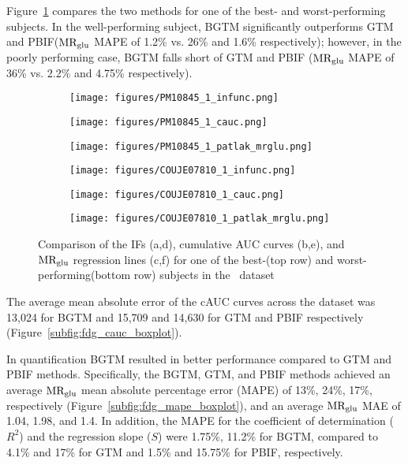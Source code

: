 Figure~\ref{fig:fdg_ifs} compares the two methods for one of the best- and worst-performing subjects.
In the well-performing subject, BGTM significantly outperforms GTM and PBIF($\text{MR}_{\text{glu}}$ MAPE of 1.2\% vs. 26\% and 1.6\% respectively); however, in the poorly performing case, BGTM falls short of GTM and PBIF ($\text{MR}_{\text{glu}}$ MAPE of 36\% vs. 2.2\% and 4.75\% respectively).

\begin{figure}[h]
	\centering
	\begin{subfigure}[b]{0.322\textwidth}
		\texttt{[image: figures/PM10845\_1\_infunc.png]}
		\caption{}
	\end{subfigure}
	\begin{subfigure}[b]{0.322\textwidth}
		\texttt{[image: figures/PM10845\_1\_cauc.png]}
		\caption{}
	\end{subfigure}
	\begin{subfigure}[b]{0.322\textwidth}
		\texttt{[image: figures/PM10845\_1\_patlak\_mrglu.png]}
		\caption{}
	\end{subfigure}
	\begin{subfigure}[b]{0.322\textwidth}
		\texttt{[image: figures/COUJE07810\_1\_infunc.png]}
		\caption{}
	\end{subfigure}
	\begin{subfigure}[b]{0.322\textwidth}
		\texttt{[image: figures/COUJE07810\_1\_cauc.png]}
		\caption{}
	\end{subfigure}
	\begin{subfigure}[b]{0.322\textwidth}
		\texttt{[image: figures/COUJE07810\_1\_patlak\_mrglu.png]}
		\caption{}
	\end{subfigure}
	\caption{Comparison of the IFs (a,d), cumulative AUC curves (b,e), and $\text{MR}_{\text{glu}}$ regression lines (c,f) for one of the best-(top row) and worst-performing(bottom row) subjects in the \fdg\ dataset}
	\label{fig:fdg_ifs}
\end{figure}

The average mean absolute error of the cAUC curves across the dataset was 13,024 for BGTM and 15,709 and 14,630 for GTM and PBIF respectively (Figure~\ref{subfig:fdg_cauc_boxplot}).

In quantification BGTM resulted in better performance compared to GTM and PBIF methods.
Specifically, the BGTM, GTM, and PBIF methods achieved an average \(\text{MR}_{\text{glu}}\) mean absolute percentage error (MAPE) of 13\%, 24\%, 17\%, respectively (Figure~\ref{subfig:fdg_mape_boxplot}), and an average \(\text{MR}_{\text{glu}}\) MAE of 1.04, 1.98, and 1.4.
In addition, the MAPE for the coefficient of determination (\(R^2\)) and the regression slope (\(S\)) were 1.75\%, 11.2\% for BGTM, compared to 4.1\% and 17\% for GTM and 1.5\% and 15.75\% for PBIF, respectively.

